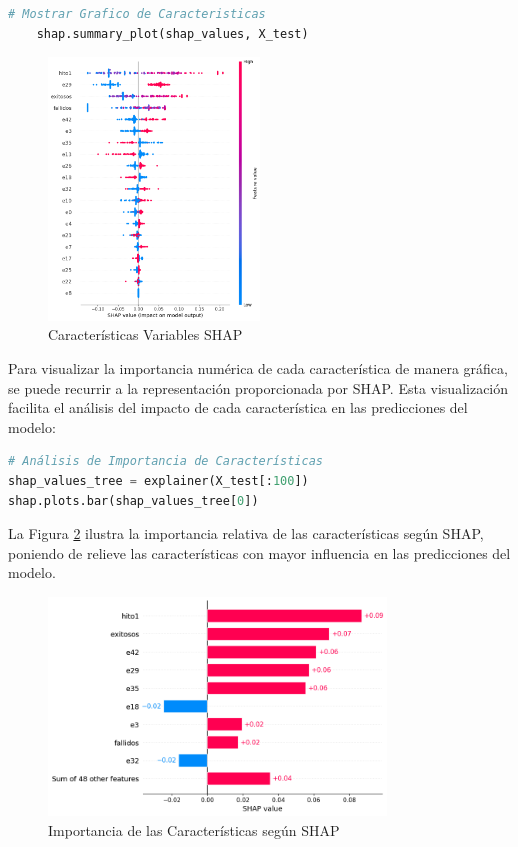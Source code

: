 \begin{lstlisting}[language=Python, caption=Grafico de Caracteristicas, label=lst:graf_caracteristicas]
    # Mostrar Grafico de Caracteristicas
    shap.summary_plot(shap_values, X_test)
\end{lstlisting}

\begin{figure}[H]
    \centering
    \includegraphics[width=0.5\textwidth]{img/shap_rf/shapForcePlot2.png}
    \caption{Características Variables SHAP}
    \label{fig:caract_var_shap}
\end{figure}


Para visualizar la importancia numérica de cada característica de manera gráfica, se puede recurrir a la representación proporcionada por SHAP. Esta visualización facilita el análisis del impacto de cada característica en las predicciones del modelo:

\begin{lstlisting}[language=Python, caption=Análisis de Importancia de Características, label=lst:cod_calvaloreshap]
# Análisis de Importancia de Características
shap_values_tree = explainer(X_test[:100])
shap.plots.bar(shap_values_tree[0])
\end{lstlisting}

La Figura \ref{fig:importancia_relativa_shap} ilustra la importancia relativa de las características según SHAP, poniendo de relieve las características con mayor influencia en las predicciones del modelo.

\begin{figure}[H]
    \centering
    \includegraphics[width=0.8\textwidth]{img/shap_rf/ImportanciaDeCaracteristicasShap.png}
    \caption{Importancia de las Características según SHAP}
    \label{fig:importancia_relativa_shap}
\end{figure}

